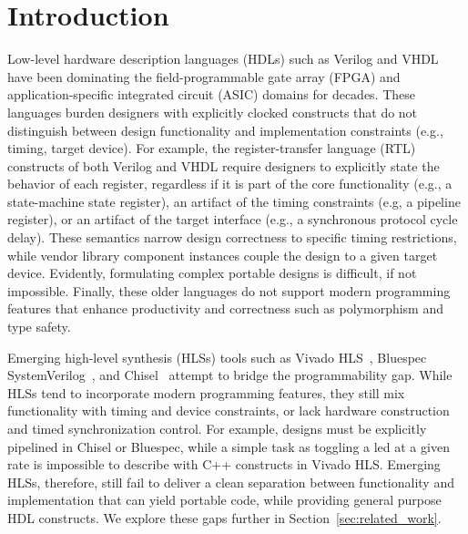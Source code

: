 \section{Introduction}


Low-level hardware description languages (HDLs) such as Verilog and VHDL have been dominating the field-programmable gate array (FPGA) and application-specific integrated circuit (ASIC) domains for decades.
These languages burden designers with explicitly clocked constructs that do not distinguish between design functionality and implementation constraints (e.g., timing, target device).
For example, the register-transfer language (RTL) constructs of both Verilog and VHDL require designers to explicitly state the behavior of each register, regardless if it is part of the core functionality (e.g., a state-machine state register), an artifact of the timing constraints (e.g, a pipeline register), or an artifact of the target interface (e.g., a synchronous protocol cycle delay).
%
These semantics narrow design correctness to specific timing restrictions, while vendor library component instances couple the design to a given target device. Evidently, formulating complex portable designs is difficult, if not impossible.
%
Finally, these older languages do not support modern programming features that enhance productivity and correctness such as polymorphism and type safety.

Emerging high-level synthesis (HLSs) tools such as Vivado HLS~\cite{Vivado2012}, Bluespec SystemVerilog~\cite{nikhil2004bluespec}, and Chisel~\cite{Bachrach2012} attempt to bridge the programmability gap.
While HLSs tend to incorporate modern programming features, they still mix functionality with timing and device constraints, or lack hardware construction and timed synchronization control. For example, designs must be explicitly pipelined in Chisel or Bluespec, while a simple task as toggling a led at a given rate is impossible to describe with C++ constructs in Vivado HLS.
Emerging HLSs, therefore, still fail to deliver a clean separation between functionality and implementation that can yield portable code, while providing general purpose HDL constructs. We explore these gaps further in Section~\ref{sec:related_work}.


